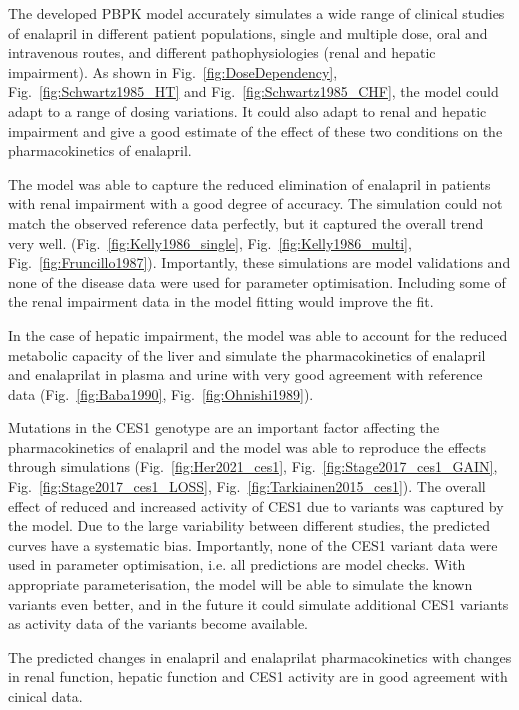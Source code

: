 The developed PBPK model accurately simulates a wide range of clinical studies of enalapril in different patient populations, single and multiple dose, oral and intravenous routes, and different pathophysiologies (renal and hepatic impairment). As shown in Fig.~\ref{fig:DoseDependency}, Fig.~\ref{fig:Schwartz1985_HT} and Fig.~\ref{fig:Schwartz1985_CHF}, the model could adapt to a range of dosing variations. It could also adapt to renal and hepatic impairment and give a good estimate of the effect of these two conditions on the pharmacokinetics of enalapril. 

The model was able to capture the reduced elimination of enalapril in patients with renal impairment with a good degree of accuracy. The simulation could not match the observed reference data perfectly, but it captured the overall trend very well. (Fig.~\ref{fig:Kelly1986_single}, Fig.~\ref{fig:Kelly1986_multi}, Fig.~\ref{fig:Fruncillo1987}). Importantly, these simulations are model validations and none of the disease data were used for parameter optimisation. Including some of the renal impairment data in the model fitting would improve the fit.

In the case of hepatic impairment, the model was able to account for the reduced metabolic capacity of the liver and simulate the pharmacokinetics of enalapril and enalaprilat in plasma and urine with very good agreement with reference data (Fig.~\ref{fig:Baba1990}, Fig.~\ref{fig:Ohnishi1989}).

Mutations in the CES1 genotype are an important factor affecting the pharmacokinetics of enalapril and the model was able to reproduce the effects through simulations (Fig.~\ref{fig:Her2021_ces1}, Fig.~\ref{fig:Stage2017_ces1_GAIN}, Fig.~\ref{fig:Stage2017_ces1_LOSS}, Fig.~\ref{fig:Tarkiainen2015_ces1}). The overall effect of reduced and increased activity of CES1 due to variants was captured by the model. Due to the large variability between different studies, the predicted curves have a systematic bias. Importantly, none of the CES1 variant data were used in parameter optimisation, i.e. all predictions are model checks. With appropriate parameterisation, the model will be able to simulate the known variants even better, and in the future it could simulate additional CES1 variants as activity data of the variants become available. 

The predicted changes in enalapril and enalaprilat pharmacokinetics with changes in renal function, hepatic function and CES1 activity are in good agreement with cinical data.

